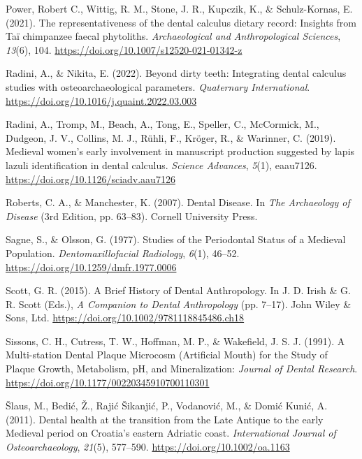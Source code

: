 \documentclass[
  b5paper,
]{book}
\newlength{\cslhangindent}
\newenvironment{CSLReferences}[2] %
 {\begin{list}{}{%
  \setlength{\itemindent}{0pt}
  \setlength{\leftmargin}{0pt}
  \setlength{\parsep}{0pt}
  \ifodd #1
   \setlength{\leftmargin}{\cslhangindent}
   \setlength{\itemindent}{-1\cslhangindent}
  \fi
  \setlength{\itemsep}{#2\baselineskip}}}
 {\end{list}}
\begin{document}
\begin{CSLReferences}{1}{0}
Power, Robert C., Wittig, R. M., Stone, J. R., Kupczik, K., \&
Schulz-Kornas, E. (2021). The representativeness of the dental calculus
dietary record: Insights from {Taï} chimpanzee faecal phytoliths.
\emph{Archaeological and Anthropological Sciences}, \emph{13}(6), 104.
\url{https://doi.org/10.1007/s12520-021-01342-z}

Radini, A., \& Nikita, E. (2022). Beyond dirty teeth: {Integrating}
dental calculus studies with osteoarchaeological parameters.
\emph{Quaternary International}.
\url{https://doi.org/10.1016/j.quaint.2022.03.003}

Radini, A., Tromp, M., Beach, A., Tong, E., Speller, C., McCormick, M.,
Dudgeon, J. V., Collins, M. J., Rühli, F., Kröger, R., \& Warinner, C.
(2019). Medieval women's early involvement in manuscript production
suggested by lapis lazuli identification in dental calculus.
\emph{Science Advances}, \emph{5}(1), eaau7126.
\url{https://doi.org/10.1126/sciadv.aau7126}

Roberts, C. A., \& Manchester, K. (2007). Dental {Disease}. In \emph{The
{Archaeology} of {Disease}} (3rd Edition, pp. 63--83). {Cornell
University Press}.

Sagne, S., \& Olsson, G. (1977). Studies of the {Periodontal Status} of
a {Medieval Population}. \emph{Dentomaxillofacial Radiology},
\emph{6}(1), 46--52. \url{https://doi.org/10.1259/dmfr.1977.0006}

Scott, G. R. (2015). A {Brief History} of {Dental Anthropology}. In J.
D. Irish \& G. R. Scott (Eds.), \emph{A {Companion} to {Dental
Anthropology}} (pp. 7--17). {John Wiley \& Sons, Ltd}.
\url{https://doi.org/10.1002/9781118845486.ch18}

Sissons, C. H., Cutress, T. W., Hoffman, M. P., \& Wakefield, J. S. J.
(1991). A {Multi-station Dental Plaque Microcosm} ({Artificial Mouth})
for the {Study} of {Plaque Growth}, {Metabolism}, {pH}, and
{Mineralization}: \emph{Journal of Dental Research}.
\url{https://doi.org/10.1177/00220345910700110301}

Šlaus, M., Bedić, Ž., Rajić Šikanjić, P., Vodanović, M., \& Domić Kunić,
A. (2011). Dental health at the transition from the {Late Antique} to
the early {Medieval} period on {Croatia}'s eastern {Adriatic} coast.
\emph{International Journal of Osteoarchaeology}, \emph{21}(5),
577--590. \url{https://doi.org/10.1002/oa.1163}


\end{CSLReferences}
\end{document}

